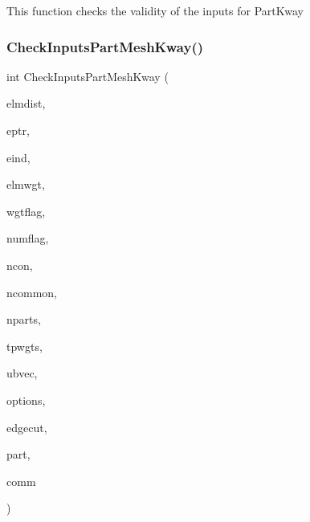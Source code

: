 This function checks the validity of the inputs for Part\+Kway \mbox{\label{a00951_af642b1a5a7e9d0db566718da7206343c}} 
\subsubsection{\texorpdfstring{Check\+Inputs\+Part\+Mesh\+Kway()}{CheckInputsPartMeshKway()}}
{\footnotesize\ttfamily int Check\+Inputs\+Part\+Mesh\+Kway (\begin{DoxyParamCaption}\item[{\hyperlink{a00876_aaa5262be3e700770163401acb0150f52}{idx\+\_\+t} $\ast$}]{elmdist,  }\item[{\hyperlink{a00876_aaa5262be3e700770163401acb0150f52}{idx\+\_\+t} $\ast$}]{eptr,  }\item[{\hyperlink{a00876_aaa5262be3e700770163401acb0150f52}{idx\+\_\+t} $\ast$}]{eind,  }\item[{\hyperlink{a00876_aaa5262be3e700770163401acb0150f52}{idx\+\_\+t} $\ast$}]{elmwgt,  }\item[{\hyperlink{a00876_aaa5262be3e700770163401acb0150f52}{idx\+\_\+t} $\ast$}]{wgtflag,  }\item[{\hyperlink{a00876_aaa5262be3e700770163401acb0150f52}{idx\+\_\+t} $\ast$}]{numflag,  }\item[{\hyperlink{a00876_aaa5262be3e700770163401acb0150f52}{idx\+\_\+t} $\ast$}]{ncon,  }\item[{\hyperlink{a00876_aaa5262be3e700770163401acb0150f52}{idx\+\_\+t} $\ast$}]{ncommon,  }\item[{\hyperlink{a00876_aaa5262be3e700770163401acb0150f52}{idx\+\_\+t} $\ast$}]{nparts,  }\item[{\hyperlink{a00876_a1924a4f6907cc3833213aba1f07fcbe9}{real\+\_\+t} $\ast$}]{tpwgts,  }\item[{\hyperlink{a00876_a1924a4f6907cc3833213aba1f07fcbe9}{real\+\_\+t} $\ast$}]{ubvec,  }\item[{\hyperlink{a00876_aaa5262be3e700770163401acb0150f52}{idx\+\_\+t} $\ast$}]{options,  }\item[{\hyperlink{a00876_aaa5262be3e700770163401acb0150f52}{idx\+\_\+t} $\ast$}]{edgecut,  }\item[{\hyperlink{a00876_aaa5262be3e700770163401acb0150f52}{idx\+\_\+t} $\ast$}]{part,  }\item[{M\+P\+I\+\_\+\+Comm $\ast$}]{comm }\end{DoxyParamCaption})}

